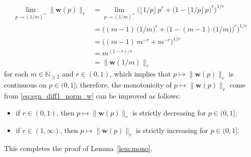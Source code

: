 \documentclass[conference, draftcls, onecolumn]{IEEEtran}
\theoremstyle{plain}
\newcommand{\bvec}[1]{\boldsymbol{#1}}
\newcommand{\lemref}[1]{Lemma~\ref{#1}}
\begin{document}
\begin{IEEEproof}[Proof of \lemref{lem:mono}]
\begin{align}
\lim_{p \to (1/m)^{+}} \| \bvec{w}( p ) \|_{r}
& =
\lim_{p \to (1/m)^{+}} \Big( \big\lfloor 1/p \big\rfloor \, p^{r} + \big( 1 - \big\lfloor 1/p \big\rfloor \, p \big)^{r} \Big)^{1/r}
\\
& =
\Big( (m-1) \, \big( 1/m \big)^{r} + \Big( 1 - (m-1) \, \big( 1/m \big) \Big)^{r} \Big)^{1/r}
\\
& =
\Big( (m-1) \, m^{-r} + m^{-r} \Big)^{1/r}
\\
& =
m^{(1-r)/r}
\label{eq:w_1/m} \\
& =
\| \bvec{w}( 1/m ) \|_{r}
\end{align}
for each $m \in \mathbb{N}_{\ge 2}$ and $r \in (0, 1)$,
which implies that $p \mapsto \| \bvec{w}( p ) \|_{r}$ is continuous on $p \in (0, 1]$;
therefore, the monotonicity of $p \mapsto \| \bvec{w}( p ) \|_{r}$ come from \eqref{eq:sgn_diff1_norm_w} can be improved as follows:
\begin{itemize}
\item
if $r \in (0, 1)$, then $p \mapsto \| \bvec{w}( p ) \|_{r}$ is strictly decreasing for $p \in (0, 1]$,
\item
if $r \in (1, \infty)$, then $p \mapsto \| \bvec{w}( p ) \|_{r}$ is strictly increasing for $p \in (0, 1]$.
\end{itemize}
This completes the proof of \lemref{lem:mono}.
\end{IEEEproof}
\end{document}
